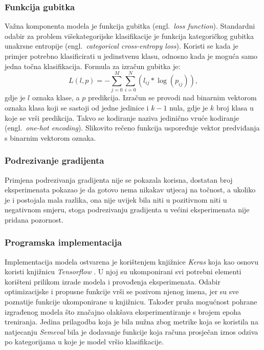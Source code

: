 \documentclass[times, utf8, zavrsni]{fer}
\begin{document}
\subsubsection{Funkcija gubitka}

Važna komponenta modela je funkcija gubitka (engl.~\emph{loss function}). Standardni odabir za problem višekategorijske klasifikacije je funkcija kategoričkog gubitka unakrsne entropije (engl.~\emph{categorical cross-entropy loss}). Koristi se kada je primjer potrebno klasificirati u jedinstvenu klasu, odnosno kada je moguća samo jedna točna klasifikacija. Formula za izračun gubitka je: \[ L(l, p)=-\sum_{j=0}^{M} \sum_{i=0}^{N}\left(l_{i j} * \log \left(p_{i j}\right)\right), \]
gdje je $l$ oznaka klase, a $p$ predikcija. Izračun se provodi nad binarnim vektorom oznaka klasa koji se sastoji od jedne jedinice i $k-1$ nula, gdje je $k$ broj klasa u koje se vrši predikcija. Takvo se kodiranje naziva jedinično vruće kodiranje (engl.~\emph{one-hot encoding}). Slikovito rečeno funkcija uspoređuje vektor predviđanja s binarnim vektorom oznaka.

\subsubsection{Podrezivanje gradijenta}

Primjena podrezivanja gradijenta nije se pokazala korisna, dostatan broj eksperimenata pokazao je da gotovo nema nikakav utjecaj na točnost, a ukoliko je i postojala mala razlika, ona nije uvijek bila niti u pozitivnom niti u negativnom smjeru, stoga podrezivanju gradijenta u većini eksperimenata nije pridana pozornost.

\subsubsection{Programska implementacija}

Implementacija modela ostvarena je korištenjem knjižnice \emph{Keras} \citep{chollet2015keras} koja kao osnovu koristi knjižnicu \emph{Tensorflow} \citep{tensorflow2015-whitepaper}. U njoj su ukomponirani svi potrebni elementi korišteni prilikom izrade modela i provođenja eksperimenata. Odabir optimizacijske i propusne funkcije vrši se pozivom njenog imena, jer su sve poznatije funkcije ukomponirane u knjižnicu. Također pruža mogućnost pohrane izgrađenog modela što značajno olakšava eksperimentiranje s brojem epoha treniranja. Jedina prilagodba koja je bila nužna zbog metrike koja se koristila na natjecanju \emph{Semeval} bila je dodavanje funkcije koja računa prosječan iznos odziva po kategorijama u koje je model vršio klasifikacije.
\end{document}
